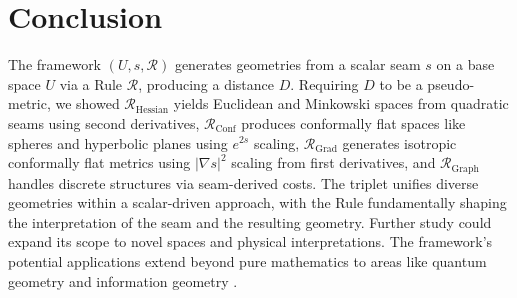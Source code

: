\documentclass[twoside,twocolumn]{article}
\numberwithin{equation}{section} %
\begin{document}

\setcounter{equation}{0}
\section{Conclusion}
The framework \( (U, s, \mathcal{R}) \) generates geometries from a scalar seam \( s \) on a base space \( U \) via a Rule \( \mathcal{R} \), producing a distance \( D \). Requiring \( D \) to be a pseudo-metric, we showed \( \mathcal{R}_{\text{Hessian}} \) yields Euclidean and Minkowski spaces from quadratic seams using second derivatives, \( \mathcal{R}_{\text{Conf}} \) produces conformally flat spaces like spheres and hyperbolic planes using \( e^{2s} \) scaling, \( \mathcal{R}_{\text{Grad}} \) generates isotropic conformally flat metrics using \( |\nabla s|^2 \) scaling from first derivatives, and \( \mathcal{R}_{\text{Graph}} \) handles discrete structures via seam-derived costs. The triplet unifies diverse geometries within a scalar-driven approach, with the Rule fundamentally shaping the interpretation of the seam and the resulting geometry. Further study could expand its scope to novel spaces and physical interpretations.
The framework's potential applications extend beyond pure mathematics to areas like quantum geometry \cite{AshtekarSchilling1999} and information geometry \cite{FujiiOgura2015}.


\end{document}
